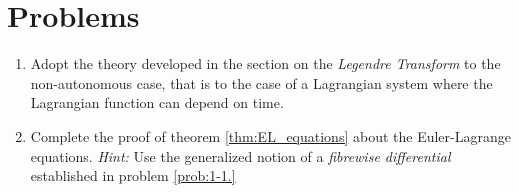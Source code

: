 \section*{Problems}

\begin{enumerate}[label = \thechapter-\arabic*.,leftmargin=*]
	\item \label{prob:1-1.} Adopt the theory developed in the section on the \emph{Legendre Transform} to the non-autonomous case, that is to the case of a Lagrangian system where the Lagrangian function can depend on time.
	\item Complete the proof of theorem \ref{thm:EL_equations} about the Euler-Lagrange equations. \emph{Hint:} Use the generalized notion of a \emph{fibrewise differential} established in problem \ref{prob:1-1.}
\end{enumerate}
